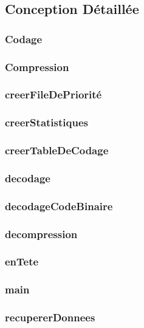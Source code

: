  \subsection{Conception Détaillée}

 \subsubsection{Codage}
 

 \subsubsection{Compression}
 

 \subsubsection{creerFileDePriorité}
 

 \subsubsection{creerStatistiques}
 

 \subsubsection{creerTableDeCodage}
 

 \subsubsection{decodage}
 

 \subsubsection{decodageCodeBinaire}
 

 \subsubsection{decompression}
 

 \subsubsection{enTete}
 

 \subsubsection{main}
 

 \subsubsection{recupererDonnees}
 
